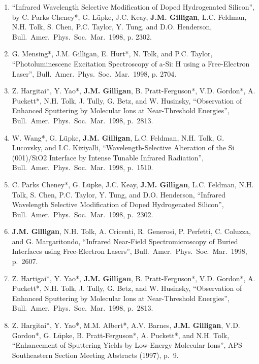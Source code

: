 \begin{enumerate}
    \item \enquote{Infrared Wavelength Selective Modification of Doped Hydrogenated Silicon},
    by C. Parks Cheney*, G. L{\"u}pke, J.C. Keay, \textbf{J.M. Gilligan}, L.C. Feldman, N.H. Tolk, S. Chen, P.C. Taylor, Y. Tung, and D.O. Henderson, 
    Bull.\ Amer.\ Phys.\ Soc.\ Mar.~1998, p. 2302.

\item
  G. Mensing*, J.M. Gilligan, E. Hurt*, N. Tolk, and P.C. Taylor,
  \enquote{Photoluminescenc Excitation Spectroscopy of a-Si: H using a Free-Electron Laser},
Bull.\ Amer.\ Phys.\ Soc.\ Mar.~1998, p. 2704.

\item
  Z. Hargitai*, Y. Yao*, \textbf{J.M. Gilligan}, B. Pratt-Ferguson*, V.D. Gordon*, A. Puckett*, N.H. Tolk, J. Tully, G. Betz, and W. Husinsky,
  \enquote{Observation of Enhanced Sputtering by Molecular Ions at Near-Threshold Energies},
Bull.\ Amer.\ Phys.\ Soc.\ Mar.~1998, p.~2813.

\item
  W. Wang*, G. L{\"u}pke, \textbf{J.M. Gilligan}, L.C. Feldman, N.H. Tolk, G. Lucovsky, and I.C. Kiziyalli,
  \enquote{Wavelength-Selective Alteration of the Si (001)/SiO2 Interface by Intense Tunable Infrared Radiation},
Bull.\ Amer.\ Phys.\ Soc.\ Mar.~1998, p.~1510.

\item
  C. Parks Cheney*, G. L\"upke, J.C. Keay, \textbf{J.M. Gilligan}, L.C. Feldman, N.H. Tolk, S. Chen, P.C. Taylor, Y. Tung, and D.O. Henderson,
  \enquote{Infrared Wavelength Selective Modification of Doped Hydrogenated Silicon},
Bull.\ Amer.\ Phys.\ Soc.\ Mar.~1998, p.~2302.

\item
  \textbf{J.M. Gilligan}, N.H. Tolk, A. Cricenti, R. Generosi, P. Perfetti, C. Coluzza, and G. Margaritondo,
  \enquote{Infrared Near-Field Spectromicroscopy of Buried Interfaces using Free-Electron Lasers},
Bull.\ Amer.\ Phys.\ Soc.\ Mar.~1998, p.~2607.

\item
  Z. Hartigai*, Y. Yao*, \textbf{J.M. Gilligan}, B. Pratt-Ferguson*, V.D. Gordon*, A. Puckett*, N.H. Tolk, J. Tully, G. Betz, and W. Husinsky,
  \enquote{Observation of Enhanced Sputtering by Molecular Ions at Near-Threshold Energies},
Bull.\ Amer.\ Phys.\ Soc.\ Mar.~1998, p.~2813.


\item
  Z. Hargitai*, Y. Yao*, M.M. Albert*, A.V. Barnes, \textbf{J.M. Gilligan}, V.D. Gordon*, G. L{\"u}pke, B. Pratt-Ferguson*, A. Puckett*, and N.H. Tolk,
  \enquote{Enhancement of Sputtering Yields by Low-Energy Molecular Ions},
  APS Southeastern Section Meeting Abstracts (1997), p.~9.


\end{enumerate}
